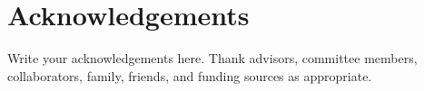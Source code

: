 \chapter*{Acknowledgements}

Write your acknowledgements here. Thank advisors, committee members, collaborators,
family, friends, and funding sources as appropriate.

\cleardoublepage
